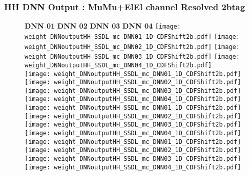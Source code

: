 \documentclass[9pt]{beamer}
\begin{document}
\begin{frame}
	\frametitle{HH DNN Output : MuMu+ElEl channel Resolved 2btag}
	\begin{figure}
	    \textbf{DNN 01} \hspace{1.2cm} \textbf{DNN 02} \hspace{1.2cm} \textbf{DNN 03} \hspace{1.2cm} \textbf{DNN 04}
        \centering
		\texttt{[image: weight\_DNNoutputHH\_SSDL\_mc\_DNN01\_1D\_CDFShift2b.pdf]}
		\texttt{[image: weight\_DNNoutputHH\_SSDL\_mc\_DNN02\_1D\_CDFShift2b.pdf]}
		\texttt{[image: weight\_DNNoutputHH\_SSDL\_mc\_DNN03\_1D\_CDFShift2b.pdf]}
		\texttt{[image: weight\_DNNoutputHH\_SSDL\_mc\_DNN04\_1D\_CDFShift2b.pdf]}\\
		\texttt{[image: weight\_DNNoutputHH\_SSDL\_mc\_DNN01\_1D\_CDFShift2b.pdf]}
		\texttt{[image: weight\_DNNoutputHH\_SSDL\_mc\_DNN02\_1D\_CDFShift2b.pdf]}
		\texttt{[image: weight\_DNNoutputHH\_SSDL\_mc\_DNN03\_1D\_CDFShift2b.pdf]}
		\texttt{[image: weight\_DNNoutputHH\_SSDL\_mc\_DNN04\_1D\_CDFShift2b.pdf]}\\
		\texttt{[image: weight\_DNNoutputHH\_SSDL\_mc\_DNN01\_1D\_CDFShift2b.pdf]}
		\texttt{[image: weight\_DNNoutputHH\_SSDL\_mc\_DNN02\_1D\_CDFShift2b.pdf]}
		\texttt{[image: weight\_DNNoutputHH\_SSDL\_mc\_DNN03\_1D\_CDFShift2b.pdf]}
		\texttt{[image: weight\_DNNoutputHH\_SSDL\_mc\_DNN04\_1D\_CDFShift2b.pdf]}\\
		\texttt{[image: weight\_DNNoutputHH\_SSDL\_mc\_DNN01\_1D\_CDFShift2b.pdf]}
		\texttt{[image: weight\_DNNoutputHH\_SSDL\_mc\_DNN02\_1D\_CDFShift2b.pdf]}
		\texttt{[image: weight\_DNNoutputHH\_SSDL\_mc\_DNN03\_1D\_CDFShift2b.pdf]}
		\texttt{[image: weight\_DNNoutputHH\_SSDL\_mc\_DNN04\_1D\_CDFShift2b.pdf]}\\
	\end{figure}
\end{frame}
\end{document}
